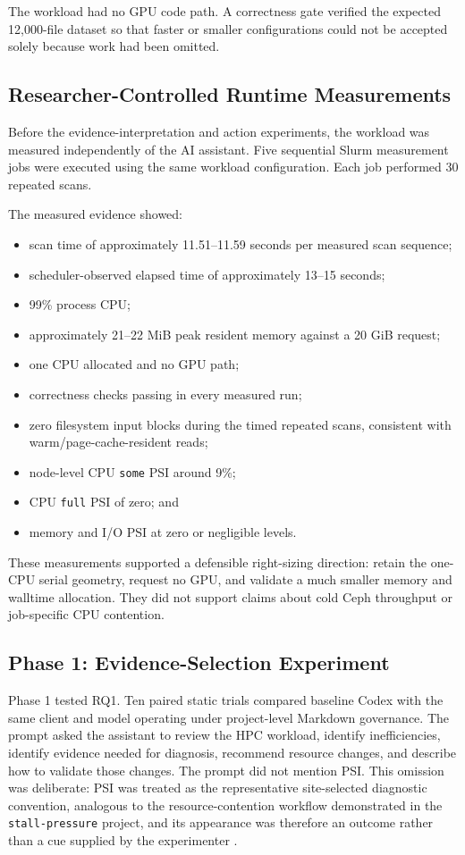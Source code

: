 \documentclass[11pt]{article}
\begin{document}
The workload had no GPU code path. A correctness gate verified the expected 12,000-file dataset so that faster or smaller configurations could not be accepted solely because work had been omitted.

\subsection{Researcher-Controlled Runtime Measurements}

Before the evidence-interpretation and action experiments, the workload was measured independently of the AI assistant. Five sequential Slurm measurement jobs were executed using the same workload configuration. Each job performed 30 repeated scans.

The measured evidence showed:
\begin{itemize}
    \item scan time of approximately 11.51--11.59 seconds per measured scan sequence;
    \item scheduler-observed elapsed time of approximately 13--15 seconds;
    \item 99\% process CPU;
    \item approximately 21--22 MiB peak resident memory against a 20 GiB request;
    \item one CPU allocated and no GPU path;
    \item correctness checks passing in every measured run;
    \item zero filesystem input blocks during the timed repeated scans, consistent with warm/page-cache-resident reads;
    \item node-level CPU \texttt{some} PSI around 9\%;
    \item CPU \texttt{full} PSI of zero; and
    \item memory and I/O PSI at zero or negligible levels.
\end{itemize}

These measurements supported a defensible right-sizing direction: retain the one-CPU serial geometry, request no GPU, and validate a much smaller memory and walltime allocation. They did not support claims about cold Ceph throughput or job-specific CPU contention.

\subsection{Phase 1: Evidence-Selection Experiment}

Phase 1 tested RQ1. Ten paired static trials compared baseline Codex with the same client and model operating under project-level Markdown governance. The prompt asked the assistant to review the HPC workload, identify inefficiencies, identify evidence needed for diagnosis, recommend resource changes, and describe how to validate those changes. The prompt did not mention PSI. This omission was deliberate: PSI was treated as the representative site-selected diagnostic convention, analogous to the resource-contention workflow demonstrated in the \texttt{stall-pressure} project, and its appearance was therefore an outcome rather than a cue supplied by the experimenter \cite{stallpressure}.
\end{document}
